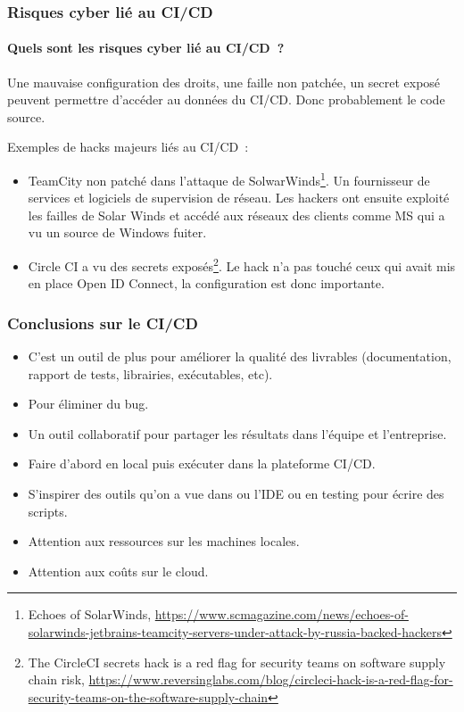\documentclass{beamer}
\begin{document}
    \begin{frame}
        \frametitle{Risques cyber lié au CI/CD}
        \framesubtitle{Quels sont les risques cyber lié au CI/CD~?}
        \transdissolve
        \pause
        Une mauvaise configuration des droits, une faille non patchée, un secret exposé peuvent permettre d'accéder au données du CI/CD.
        Donc probablement le code source.

        Exemples de hacks majeurs liés au CI/CD~:
        \begin{itemize}
            \item TeamCity non patché dans l'attaque de SolwarWinds\footnote{Echoes of SolarWinds, \url{https://www.scmagazine.com/news/echoes-of-solarwinds-jetbrains-teamcity-servers-under-attack-by-russia-backed-hackers}}.
            Un fournisseur de services et logiciels de supervision de réseau.
            Les hackers ont ensuite exploité les failles de Solar Winds et accédé aux réseaux des clients comme MS qui a vu un source de Windows fuiter.
            \item Circle CI a vu des secrets exposés\footnote{The CircleCI secrets hack is a red flag for security teams on software supply chain risk, \url{https://www.reversinglabs.com/blog/circleci-hack-is-a-red-flag-for-security-teams-on-the-software-supply-chain}}.
            Le hack n'a pas touché ceux qui avait mis en place Open ID Connect, la configuration est donc importante.
        \end{itemize}
    \end{frame}

    \begin{frame}
        \frametitle{Conclusions sur le CI/CD}
        \transdissolve
        \begin{itemize}
            \item C'est un outil de plus pour améliorer la qualité des livrables (documentation, rapport de tests, librairies, exécutables, etc).
            \item Pour éliminer du bug.
            \item Un outil collaboratif pour partager les résultats dans l'équipe et l'entreprise.
            \item Faire d'abord en local puis exécuter dans la plateforme CI/CD.
            \item S'inspirer des outils qu'on a vue dans ou l'IDE ou en testing pour écrire des scripts.
            \item Attention aux ressources sur les machines locales.
            \item Attention aux coûts sur le cloud.
        \end{itemize}
    \end{frame}
\end{document}
